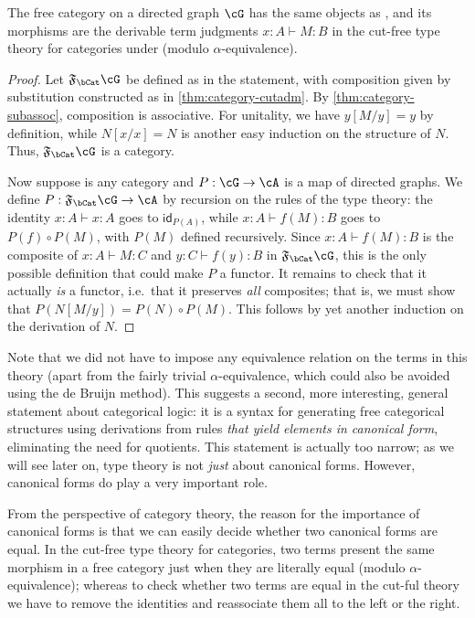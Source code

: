 \documentclass{book}
\def\idfunc{\mathsf{id}}
\let\types\vdash
\newcommand{\F}[1]{\mathfrak{F}_{#1}}
\begin{document}
\begin{thm}\label{thm:category-initial-2}
  The free category on a directed graph $\cG$ has the same objects as \cG, and its morphisms are the derivable term judgments $x:A\types M:B$ in the cut-free type theory for categories under \cG (modulo $\alpha$-equivalence).
\end{thm}
\begin{proof}
  Let $\F\bCat\cG$ be defined as in the statement, with composition given by substitution constructed as in \cref{thm:category-cutadm}.
  By \cref{thm:category-subassoc}, composition is associative.
  For unitality, we have $y[M/y] = y$ by definition, while $N[x/x] = N$ is another easy induction on the structure of $N$.
  Thus, $\F\bCat\cG$ is a category.

  Now suppose \cA is any category and $P:\cG\to\cA$ is a map of directed graphs.
  We define $P:\F\bCat\cG \to\cA$ by recursion on the rules of the type theory: the identity $x:A\types x:A$ goes to $\idfunc_{P(A)}$, while $x:A\types f(M):B$ goes to $P(f) \circ P(M)$, with $P(M)$ defined recursively.
  Since $x:A\types f(M):B$ is the composite of $x:A\types M:C$ and $y:C\types f(y):B$ in $\F\bCat\cG$, this is the only possible definition that could make $P$ a functor.
  It remains to check that it actually \emph{is} a functor, i.e.\ that it preserves \emph{all} composites; that is, we must show that $P(N[M/y]) = P(N) \circ P(M)$.
  This follows by yet another induction on the derivation of $N$.
\end{proof}

Note that we did not have to impose any equivalence relation on the terms in this theory (apart from the fairly trivial $\alpha$-equivalence, which could also be avoided using the de Bruijn method).
This suggests a second, more interesting, general statement about categorical logic: it is
{a syntax for generating free categorical structures using derivations from rules}
\emph{that yield elements in canonical form}, eliminating the need for quotients.
This statement is actually too narrow; as we will see later on, type theory is not \emph{just} about canonical forms.
However, canonical forms do play a very important role.

From the perspective of category theory, the reason for the importance of canonical forms is that we can easily decide whether two canonical forms are equal.
In the cut-free type theory for categories, two terms present the same morphism in a free category just when they are literally equal (modulo $\alpha$-equivalence); whereas to check whether two terms are equal in the cut-ful theory we have to remove the identities and reassociate them all to the left or the right.
\end{document}
